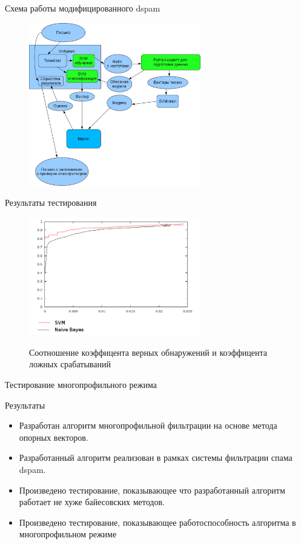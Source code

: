 \documentclass{beamer}
\begin{document}
\begin{frame}{Схема работы модифицированного dspam}
\begin{figure}[h]
\begin{center}
    \includegraphics[width=7.5cm]{../img/working_scheme2}
\end{center}
\end{figure}
\end{frame}

\begin{frame}{Результаты тестирования}
\begin{figure}[h]
\begin{center}
    \includegraphics[width=7.5cm]{../img/graphic}
\end{center}
    Соотношение коэффицента верных обнаружений и коэффицента ложных срабатываний
\end{figure}

\end{frame}

\begin{frame}{Тестирование многопрофильного режима}
\end{frame}

\begin{frame}{Результаты}
\begin{itemize}
    \item Разработан алгоритм многопрофильной фильтрации на основе метода опорных векторов.
    \item Разработанный алгоритм реализован в рамках системы фильтрации спама dspam.
    \item Произведено тестирование, показывающее что разработанный алгоритм работает не хуже байесовских методов. 
    \item Произведено тестирование, показывающее работоспособность алгоритма в многопрофильном режиме
\end{itemize}
\end{frame}
\end{document}
